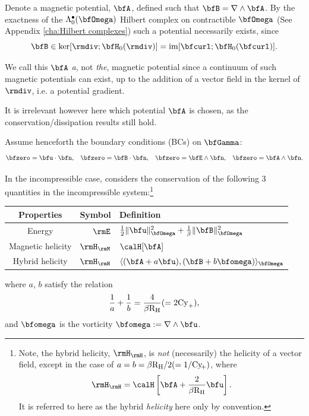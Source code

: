     Denote a magnetic potential, $\bfA$, defined such that $\bfB  =  \nabla\wedge\bfA$. By the exactness of the $\Lambda_{0}^{\bullet}(\bfOmega)$ Hilbert complex on contractible $\bfOmega$ (See Appendix \ref{cha:Hilbert complexes}) such a potential necessarily exists, since
    \begin{equation}
        \bfB  \in  \ker[\rmdiv; \bfH_{0}(\rmdiv)]  =  \im[\bfcurl; \bfH_{0}(\bfcurl)].
    \end{equation}
    
    \begin{remark}
        We call this $\bfA$ \emph{a}, not \emph{the}, magnetic potential since a continuum of such magnetic potentials can exist, up to the addition of a vector field in the kernel of $\rmdiv$, i.e. a potential gradient.
        
        It is irrelevant however here which potential $\bfA$ is chosen, as the conservation/dissipation results still hold.
    \end{remark}

    Assume henceforth the boundary conditions (BCs) on $\bfGamma$: 
    \begin{align}\label{eqn:canonical boundary conditions}
        \bfzero  =  \bfu\cdot\bfn,   &&
        \bfzero  =  \bfB\cdot\bfn,   &&
        \bfzero  =  \bfE\wedge\bfn,  &&
        \bfzero  =  \bfA\wedge\bfn.
    \end{align}

    In the incompressible case, \cite{Laakmann_Hu_Farrell_2022} considers the conservation of the following 3 quantities in the incompressible system:\footnote{Note, the hybrid helicity, $\rmH_{\rmH}$, is \emph{not} (necessarily) the helicity of a vector field, except in the case of $a = b = \beta\mathrm{R}_{\mathrm{H}}/2 (= 1/\mathrm{Cy}\!_{+})$, where
    \begin{equation}
        \rmH_{\rmH} = \calH\left[\bfA + \frac{2}{\beta\rmRH}\bfu\right].
    \end{equation}
    It is referred to here as the hybrid \emph{helicity} here only by convention.} 
    \begin{center}\begin{tabular}{ c | r : l }
        Properties  &  Symbol  &  Definition  \\
        \hline\hline
        Energy  &  $\rmE$  &  $\frac{1}{2}\|\bfu\|_{\bfOmega}^{2} + \frac{1}{\beta}\|\bfB\|_{\bfOmega}^{2}$  \\
        \hdashline
        Magnetic helicity \cite{Blackman_2015}  &  $\rmH_{\rmM}$  &  $\calH[\bfA]$  \\
        Hybrid helicity \cite{Subramanian_Brandenburg_2006}  &  $\rmH_{\rmH}$  &  $\langle(\bfA + a\bfu), (\bfB + b\bfomega)\rangle_{\bfOmega}$
    \end{tabular}\end{center}
    where $a$, $b$ satisfy the relation
    \begin{equation}
        \frac{1}{a} + \frac{1}{b}  =  \frac{4}{\beta\mathrm{R}_{\mathrm{H}}}  (=  2\mathrm{Cy}_{+}),
    \end{equation}
    and $\bfomega$ is the vorticity $\bfomega  :=  \nabla\wedge\bfu$.
    
